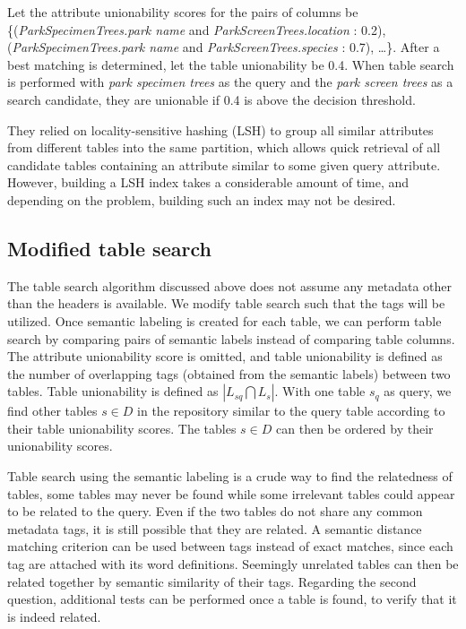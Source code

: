 Let the attribute unionability scores for the pairs of columns be \\ \{(\textit{ParkSpecimenTrees.park name} and \textit{ParkScreenTrees.location} : 0.2), (\textit{ParkSpecimenTrees.park name} and \textit{ParkScreenTrees.species} : 0.7), \dots\}. After a best matching is determined, let the table unionability be 0.4. When table search is performed with \textit{park specimen trees} as the query and the \textit{park screen trees} as a search candidate, they are unionable if 0.4 is above the decision threshold.

They relied on locality-sensitive hashing (LSH) to group all similar attributes from different tables into the same partition, which allows quick retrieval of all candidate tables containing an attribute similar to some given query attribute. However, building a LSH index takes a considerable amount of time, and depending on the problem, building such an index may not be desired.

\subsection{Modified table search}
\label{ssec:ModifiedTableSearch}

The table search algorithm discussed above does not assume any metadata other than the headers is available. We modify table search such that the tags will be utilized. Once semantic labeling is created for each table, we can perform table search by comparing pairs of semantic labels instead of comparing table columns. The attribute unionability score is omitted, and table unionability is defined as the number of overlapping tags (obtained from the semantic labels) between two tables. Table unionability is defined as $|L_{sq}\bigcap L_{s}|$. With one table $s_{q}$ as query, we find other tables $s\in D$ in the repository similar to the query table according to their table unionability scores. The tables $s\in D$ can then be ordered by their unionability scores.

Table search using the semantic labeling is a crude way to find the relatedness of tables, some tables may never be found while some irrelevant tables could appear to be related to the query. Even if the two tables do not share any common metadata tags, it is still possible that they are related. A semantic distance matching criterion can be used between tags instead of exact matches, since each tag are attached with its word definitions. Seemingly unrelated tables can then be related together by semantic similarity of their tags. Regarding the second question, additional tests can be performed once a table is found, to verify that it is indeed related.

